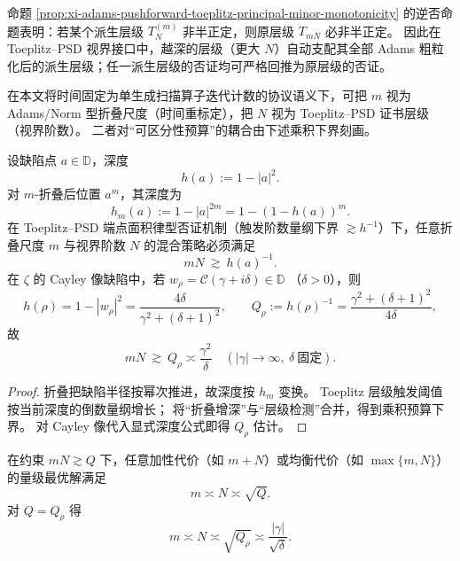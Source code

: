 \begin{remark}\label{rem:xi-adams-toeplitz-no-info-increase}
命题 \ref{prop:xi-adams-pushforward-toeplitz-principal-minor-monotonicity} 的逆否命题表明：若某个派生层级 \(T_N^{(m)}\) 非半正定，则原层级 \(T_{mN}\) 必非半正定。
因此在 Toeplitz--PSD 视界接口中，越深的层级（更大 \(N\)）自动支配其全部 Adams 粗粒化后的派生层级；任一派生层级的否证均可严格回推为原层级的否证。
\end{remark}

在本文将时间固定为单生成扫描算子迭代计数的协议语义下，可把 \(m\) 视为 Adams/Norm 型折叠尺度（时间重标定），把 \(N\) 视为 Toeplitz--PSD 证书层级（视界阶数）。
二者对“可区分性预算”的耦合由下述乘积下界刻画。

\begin{theorem}\label{thm:xi-time-horizon-product-lower-bound}
设缺陷点 \(a\in\mathbb D\)，深度
\[
h(a):=1-|a|^2.
\]
对 \(m\)-折叠后位置 \(a^m\)，其深度为
\[
h_m(a):=1-|a|^{2m}=1-(1-h(a))^m.
\]
在 Toeplitz--PSD 端点面积律型否证机制（触发阶数量纲下界 \(\gtrsim h^{-1}\)）下，任意折叠尺度 \(m\) 与视界阶数 \(N\) 的混合策略必须满足
\[
mN\ \gtrsim\ h(a)^{-1}.
\]
在 \(\zeta\) 的 Cayley 像缺陷中，若
\(
w_\rho=\mathcal C(\gamma+i\delta)\in\mathbb D
\)
（\(\delta>0\)），则
\[
h(\rho)=1-|w_\rho|^2
=\frac{4\delta}{\gamma^2+(\delta+1)^2},
\qquad
Q_\rho:=h(\rho)^{-1}
=\frac{\gamma^2+(\delta+1)^2}{4\delta},
\]
故
\[
mN\ \gtrsim\ Q_\rho\asymp \frac{\gamma^2}{\delta}\quad(|\gamma|\to\infty,\ \delta\ \text{固定}).
\]
\end{theorem}

\begin{proof}
折叠把缺陷半径按幂次推进，故深度按 \(h_m\) 变换。
Toeplitz 层级触发阈值按当前深度的倒数量纲增长；
将“折叠增深”与“层级检测”合并，得到乘积预算下界。
对 Cayley 像代入显式深度公式即得 \(Q_\rho\) 估计。
\end{proof}

\begin{proposition}[乘积约束下的最优配分平方根律]\label{prop:xi-optimal-allocation-under-product-bound}
在约束
\(
mN\gtrsim Q
\)
下，任意加性代价（如 \(m+N\)）或均衡代价（如 \(\max\{m,N\}\)）的量级最优解满足
\[
m\asymp N\asymp \sqrt Q.
\]
对 \(Q=Q_\rho\) 得
\[
m\asymp N\asymp \sqrt{Q_\rho}\asymp \frac{|\gamma|}{\sqrt\delta}.
\]
\end{proposition}


